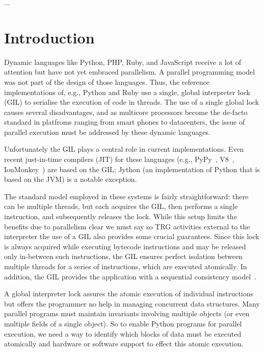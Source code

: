 \documentclass{sigplanconf}
\begin{document}


\keywords
...

\section{Introduction}


Dynamic languages like Python, PHP, Ruby, and JavaScript receive a lot
of attention but have not yet embraced parallelism. A parallel
programming model was not part of the design of those languages. Thus,
the reference implementations of, e.g., Python and Ruby use a single,
global interpreter lock (GIL) to serialise the execution of code in
threads. The use of a single global lock causes several disadvantages,
and as multicore processors become the de-facto standard in platfroms
ranging from smart phones to datacenters, the issue of parallel
execution must be addressed by these dynamic languages.

Unfortunately the GIL plays a central role in current
implementations. Even recent just-in-time compilers (JIT) for these
languages (e.g., PyPy~\cite{cfbolz09}, V8~\cite{kevin10},
IonMonkey~\cite{ionmonkey}) are based on the GIL; Jython (an
implementation of Python that is based on the JVM) is a notable
exception.

The standard model employed in these systems is fairly
straightforward: there can be multiple threads, but each acquires the
GIL, then performs a single instruction, and subsequently releases the
lock.  While this setup limits the benefits due to parallelism %
clear we must say so TRG %
activities external to the interpreter the use of a GIL also provides
some crucial guarantees. Since this lock is always acquired while
executing bytecode instructions and may be released only in-between
such instructions, the GIL ensures perfect isolation between multiple
threads for a series of instructions, which are executed atomically.
In addition, the GIL provides the application with a sequential
consistency model~\cite{lamport79}.

A global interpreter lock assures the atomic execution of individual
instructions but offers the programmer no help in managing concurrent
data structures. Many parallel programs must maintain invariants
involving multiple objects (or even multiple fields of a single
object).  So to enable Python programs for parallel execution, we need
a way to identify which blocks of data must be executed atomically and
hardware or software support to effect this atomic execution.
\end{document}
